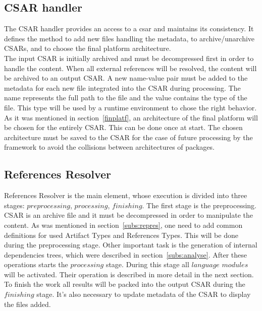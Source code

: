 \subsection{CSAR handler} \label{subs:casr_h}
The CSAR handler provides an access to a \gls{csar} and maintains its consistency. 
It defines the method to add new files handling the metadata, to \mbox{archive/unarchive} CSARs, and to choose the final platform architecture. \\
The input CSAR is initially archived and must be decompressed first in order to handle the content.
When all external references will be resolved, the content will be archived to an output CSAR.
A new name-value pair must be added to the metadata for each new file integrated into the CSAR during processing. 
The name represents the full path to the file and the value contains the type of the file. 
This type will be used by a runtime environment to chose the right behavior. %
As it was mentioned in section~\ref{finplatf}, an architecture of the final platform will be chosen for the entirely CSAR.
This can be done once at start.
The chosen architecture must be saved to the CSAR for the case of future processing by the framework to avoid the collisions between architectures of packages.

\subsection{References Resolver} \label{subs:RR}
References Resolver is the main element, whose execution is divided into three stages: $preprocessing$, $processing$, $finishing$. %
The first stage is the preprocessing.
CSAR is an archive file and it must be decompressed in order to manipulate the content. 
As was mentioned in section~\ref{subs:repres}, one need to add common definitions for used Artifact Types and References Types.
This will be done during the preprocessing stage.
Other important task is the generation of internal dependencies trees, which were described in section~\ref{subs:analyse}.
After these operations starts the $processing$ stage.
During this stage all $language$ $modules$ will be activated.
Their operation is described in more detail in the next section. %
To finish the work all results will be packed into the output CSAR during the $finishing$ stage.
It's also necessary to update metadata of the CSAR to display the files added.
%

